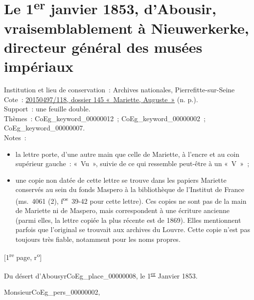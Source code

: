 \documentclass{book}
\begin{document}
\hypertarget{CoEg_Mariette_1853-01-01}{}
\section*{Le 1\textsuperscript{er} janvier 1853, d’Abousir, vraisemblablement à Nieuwerkerke, directeur général des musées impériaux}
{\footnotesize
\noindent Institution et lieu de conservation~: Archives nationales, Pierrefitte-sur-Seine\\
Cote~: \hyperlink{CoEg_Mariette_ms_001}{20150497/118, dossier 145 «~Mariette, Auguste~»} (n. p.).\\
Support~: une feuille double.\\
Thèmes~: \gls{CoEg_keyword_00000012}~; \gls{CoEg_keyword_00000002}~; \gls{CoEg_keyword_00000007}.\\
Notes~: \begin{itemize} \item la lettre porte, d’une autre main que celle de Mariette, à l’encre et au coin supérieur gauche~: «~Vu~», suivie de ce qui ressemble peut-être à un «~V~»~;
\item une copie non datée de cette lettre se trouve dans les papiers Mariette conservés au sein du fonds Maspero à la bibliothèque de l’Institut de France (ms.~4061 (2), f\textsuperscript{os}~39-42 pour cette lettre). Ces copies ne sont pas de la main de Mariette ni de Maspero, mais correspondent à une écriture ancienne (parmi elles, la lettre copiée la plus récente est de 1869). Elles mentionnent parfois que l’original se trouvait aux archives du Louvre. Cette copie n’est pas toujours très fiable, notamment pour les noms propres. \end{itemize}
\begin{center} {[1\textsuperscript{re} page, r\textsuperscript{o}]}\end{center}}
\begin{flushright}Du désert d’Abousyr\gls{CoEg_place_00000008}, le 1\textsuperscript{\underline{er}}  Janvier 1853.\end{flushright}
\hspace{1cm} Monsieur\gls{CoEg_pers_00000002},\\
\end{document}

